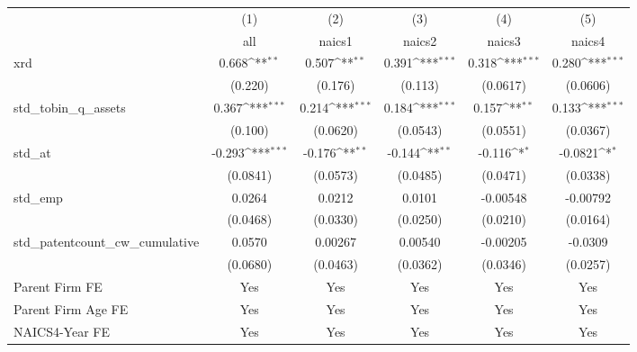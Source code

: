 {
\def\sym#1{\ifmmode^{#1}\else\(^{#1}\)\fi}
\begin{tabular}{l*{5}{c}}
\hline\hline
            &\multicolumn{1}{c}{(1)}&\multicolumn{1}{c}{(2)}&\multicolumn{1}{c}{(3)}&\multicolumn{1}{c}{(4)}&\multicolumn{1}{c}{(5)}\\
            &\multicolumn{1}{c}{all}&\multicolumn{1}{c}{naics1}&\multicolumn{1}{c}{naics2}&\multicolumn{1}{c}{naics3}&\multicolumn{1}{c}{naics4}\\
\hline
xrd         &       0.668\sym{**} &       0.507\sym{**} &       0.391\sym{***}&       0.318\sym{***}&       0.280\sym{***}\\
            &     (0.220)         &     (0.176)         &     (0.113)         &    (0.0617)         &    (0.0606)         \\
[1em]
std\_tobin\_q\_assets&       0.367\sym{***}&       0.214\sym{***}&       0.184\sym{***}&       0.157\sym{**} &       0.133\sym{***}\\
            &     (0.100)         &    (0.0620)         &    (0.0543)         &    (0.0551)         &    (0.0367)         \\
[1em]
std\_at      &      -0.293\sym{***}&      -0.176\sym{**} &      -0.144\sym{**} &      -0.116\sym{*}  &     -0.0821\sym{*}  \\
            &    (0.0841)         &    (0.0573)         &    (0.0485)         &    (0.0471)         &    (0.0338)         \\
[1em]
std\_emp     &      0.0264         &      0.0212         &      0.0101         &    -0.00548         &    -0.00792         \\
            &    (0.0468)         &    (0.0330)         &    (0.0250)         &    (0.0210)         &    (0.0164)         \\
[1em]
std\_patentcount\_cw\_cumulative&      0.0570         &     0.00267         &     0.00540         &    -0.00205         &     -0.0309         \\
            &    (0.0680)         &    (0.0463)         &    (0.0362)         &    (0.0346)         &    (0.0257)         \\
[1em]
Parent Firm FE&         Yes         &         Yes         &         Yes         &         Yes         &         Yes         \\
[1em]
Parent Firm Age FE&         Yes         &         Yes         &         Yes         &         Yes         &         Yes         \\
[1em]
NAICS4-Year FE&         Yes         &         Yes         &         Yes         &         Yes         &         Yes         \\

\end{tabular}}

